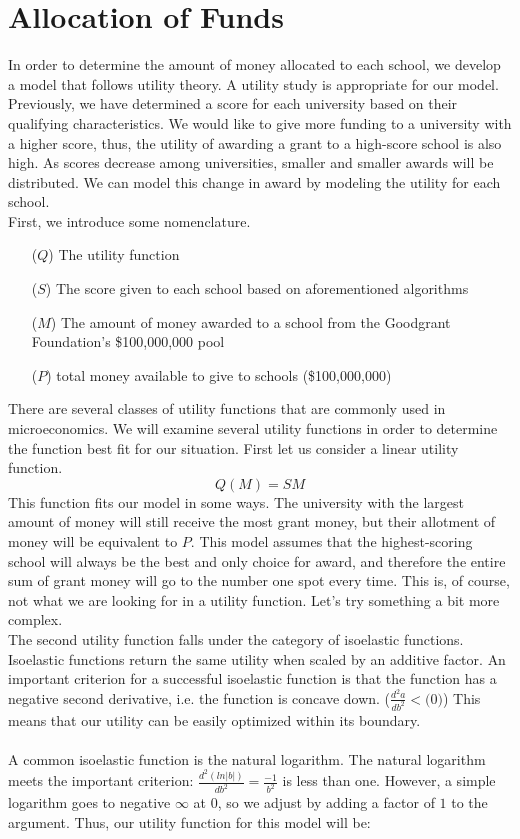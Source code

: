 \documentclass[paper.tex]{subfiles}
\begin{document}
	\section{Allocation of Funds}
	
	In order to determine the amount of money allocated to each school, we develop a model that follows utility theory. A utility study is appropriate for our model. Previously, we have determined a score for each university based on their qualifying characteristics. We would like to give more funding to a university with a higher score, thus, the utility of awarding a grant to a high-score school is also high. As scores decrease among universities, smaller and smaller awards will be distributed. We can model this change in award by modeling the utility for each school.
	\\
	
	First, we introduce some nomenclature.
	\begin{itemize}
		\item[($Q$)] The utility function
		\item[($S$)] The score given to each school based on aforementioned algorithms
		\item[($M$)] The amount of money awarded to a school from the Goodgrant Foundation's \$100,000,000 pool
		\item[($P$)] total money available to give to schools (\$100,000,000)
	\end{itemize}
	There are several classes of utility functions that are commonly used in microeconomics. We will examine several utility functions in order to determine the function best fit for our situation. First let us consider a linear utility function.
	$$ Q(M) = SM $$
	This function fits our model in some ways. The university with the largest amount of money will still receive the most grant money, but their allotment of money will be equivalent to $P$. This model assumes that the highest-scoring school will always be the best and only choice for award, and therefore the entire sum of grant money will go to the number one spot every time. This is, of course, not what we are looking for in a utility function. Let's try something a bit more complex.
	\\
	
	The second utility function falls under the category of isoelastic functions. Isoelastic functions return the same utility when scaled by an additive factor. \cite{norstad1999introduction}
	An important criterion for a successful isoelastic function is that the function has a negative second derivative, i.e. the function is concave down. ($ \frac{d^2a}{db^2} < ($0$) $)
	This means that our utility can be easily optimized within its boundary. 
	\\\\
	A common isoelastic function is the natural logarithm. The natural logarithm meets the important criterion: $ \frac{d^2(ln|b|)}{db^2} = \frac{-1}{b^2} $ is less than one. However, a simple logarithm goes to negative $\infty$ at $0$, so we adjust by adding a factor of $1$ to the argument. Thus, our utility function for this model will be:
	
\end{document}
